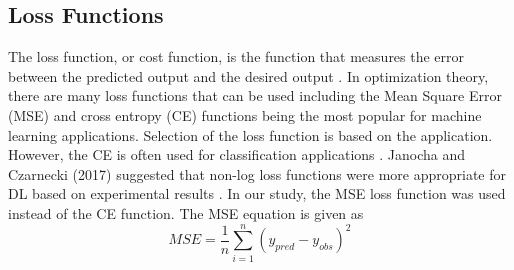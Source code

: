 \subsection{Loss Functions}

The loss function, or cost function, is the function that measures the error between the predicted output and the desired output \citep{Goodfellow2016}. In optimization theory, there are many loss functions that can be used including the Mean Square Error (MSE) and cross entropy (CE) functions being the most popular for machine learning applications.  Selection of the loss function is based on the application. However, the CE is often used for classification applications \citep{Kline2005, Wu2017}. Janocha and Czarnecki (2017) suggested that non-log loss functions were more appropriate for DL based on experimental results \citep{Janocha2017}. In our study, the MSE loss function was used instead of the CE function. The MSE equation is given as 
%
\begin{equation}
\label{eq:MSE}
MSE = \frac{1}{n} \sum_{i=1}^{n} \left( y_{pred} - y_{obs} \right)^{2}
\end{equation}
%
